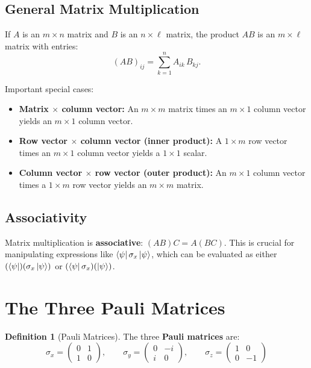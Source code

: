 \documentclass[11pt,a4paper]{article}
\theoremstyle{definition}
\newtheorem{definition}{Definition}[section]
\theoremstyle{plain}
\theoremstyle{remark}
\begin{document}
\subsection{General Matrix Multiplication}

If $A$ is an $m \times n$ matrix and $B$ is an $n \times \ell$ matrix, the product $AB$ is an $m \times \ell$ matrix with entries:
\[
    (AB)_{ij} = \sum_{k=1}^{n} A_{ik}\, B_{kj}.
\]

Important special cases:
\begin{itemize}
    \item \textbf{Matrix $\times$ column vector:} An $m \times m$ matrix times an $m \times 1$ column vector yields an $m \times 1$ column vector.
    \item \textbf{Row vector $\times$ column vector (inner product):} A $1 \times m$ row vector times an $m \times 1$ column vector yields a $1 \times 1$ scalar.
    \item \textbf{Column vector $\times$ row vector (outer product):} An $m \times 1$ column vector times a $1 \times m$ row vector yields an $m \times m$ matrix.
\end{itemize}

\subsection{Associativity}

Matrix multiplication is \textbf{associative}: $(AB)C = A(BC)$. This is crucial for manipulating expressions like $\bra{\psi}\sigma_x\ket{\psi}$, which can be evaluated as either $(\bra{\psi})(\sigma_x\ket{\psi})$ or $(\bra{\psi}\sigma_x)(\ket{\psi})$.

\section{The Three Pauli Matrices}

\begin{definition}[Pauli Matrices]
    The three \textbf{Pauli matrices} are:
    \[
        \boxed{\sigma_x = \begin{pmatrix} 0 & 1 \\ 1 & 0 \end{pmatrix}, \qquad \sigma_y = \begin{pmatrix} 0 & -i \\ i & 0 \end{pmatrix}, \qquad \sigma_z = \begin{pmatrix} 1 & 0 \\ 0 & -1 \end{pmatrix}}
    \]
\end{definition}
\end{document}
